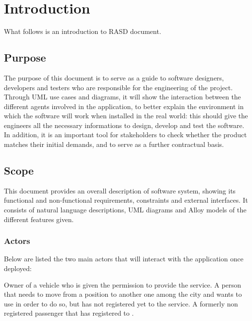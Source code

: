 \section{Introduction}	%
What follows is an introduction to \myTaxiService{} RASD document.

\subsection{Purpose}
The purpose of this document is to serve as a guide to software designers, developers and testers who are responsible for the engineering of the \myTaxiService{} project.
Through UML use cases and diagrams, it will show the interaction between the different agents involved in the application, to better explain the environment in which the software will work when installed in the real world: this should give the engineers all the necessary informations to design, develop and test the software.
In addition, it is an important tool for stakeholders to check whether the product matches their initial demands, and to serve as a further contractual basis.

\subsection{Scope}
This document provides an overall description of \myTaxiService{} software system, showing its functional and non-functional requirements, constraints and external interfaces.
It consists of natural language descriptions, UML diagrams and Alloy models of the different features given.

\subsubsection{Actors}
Below are listed the two main actors that will interact with the application once deployed:
\begin{itemize}
		Owner of a vehicle who is given the permission to provide the service.
	 A person that needs to move from a position to another one among the city and wants to use \myTaxiService{} in order to do so, but has not registered yet to the service.
	 A formerly non registered passenger that has registered to \myTaxiService{}.
\end{itemize}

